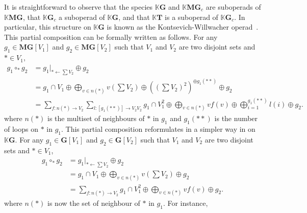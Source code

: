 \documentclass[a4paper]{article}
\theoremstyle{definition}
\newcommand{\K}{\mathbb{K}}
\newcommand{\MG}{\mathbf{MG}}
\newcommand{\G}{\mathbf{G}}
\newcommand{\T}{\mathbf{T}}
\begin{document}
It is straightforward to observe that the
species $\K \G$ and $\K \MG_c$ are suboperads of $\K \MG$, that $\K \G_c$ a suboperad
of $\K \G$, and that $\K \T$ is a suboperad of $\K \G_c$. In particular, this structure on
$\K \G$ is known as the Kontsevich-Willwacher operad~\cite{MV19}. This partial composition
can be formally written as follows. For any $g_1 \in \MG[V_1]$ and $g_2 \in \MG[V_2]$ such
that $V_1$ and $V_2$ are two disjoint sets and $\ast \in V_1$,
\begin{equation}\begin{split}
	g_1\circ_{\ast} g_2 &= g_1|_{\ast \leftarrow \sum V_2}\oplus g_2\\
	&= g_1\cap V_1 \oplus\bigoplus_{v\in n(\ast)}v(\sum V_2)\oplus((\sum V_2)^2)^{\oplus g_1(\ast\ast)}\oplus g_2 \\
	&= \sum_{f:n(\ast)\to V_2}\sum_{l:[g_1(\ast\ast)]\to V_2V_2} g_1\cap V_1^2\oplus\bigoplus_{v\in n(\ast)}vf(v)\oplus\bigoplus_{i=1}^{g_1(\ast\ast)}l(i) \oplus g_2.
\end{split}\end{equation}
where $n(\ast)$ is the multiset of neighbours of $\ast$ in $g_1$ and $g_1(\ast\ast)$ is
the number of loops on $\ast$ in $g_1$. This partial composition reformulates in
a simpler way in on $\K\G$. For any $g_1 \in \G[V_1]$ and $g_2 \in \G[V_2]$ such
that $V_1$ and $V_2$ are two disjoint sets and $\ast \in V_1$, 
\begin{equation}\begin{split}
	g_1\circ_{\ast} g_2 &= g_1|_{\ast \leftarrow \sum V_2}\oplus g_2\\
	&= g_1\cap V_1 \oplus\bigoplus_{v\in n(\ast)}v(\sum V_2)\oplus g_2 \\
	&= \sum_{f:n(\ast)\rightarrow V_2} g_1\cap V_1^2\oplus\bigoplus_{v\in n(\ast)}vf(v)\oplus g_2.
\end{split}\end{equation}
where $n(\ast)$ is now the set of neighbour of $\ast$ in $g_1$. For instance,
\end{document}
